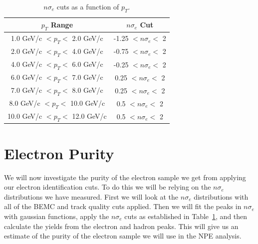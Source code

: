 \begin{table}
\centering
\begin{tabular}{|c|c|}
\hline
$p_T$ Range            & $n\sigma_e$ Cut \\
\hline
1.0 GeV/c $< p_T <$ 2.0 GeV/c   & -1.25 $< n\sigma_e <$ 2\\
\hline
2.0 GeV/c $< p_T <$ 4.0 GeV/c   & -0.75 $< n\sigma_e <$ 2\\
\hline
4.0 GeV/c $< p_T <$ 6.0 GeV/c   & -0.25 $< n\sigma_e <$ 2\\
\hline
6.0 GeV/c $< p_T <$ 7.0 GeV/c   & 0.25 $< n\sigma_e <$ 2\\
\hline
7.0 GeV/c $< p_T <$ 8.0 GeV/c   & 0.25 $< n\sigma_e <$ 2\\
\hline
8.0 GeV/c $< p_T <$ 10.0 GeV/c   & 0.5 $< n\sigma_e <$ 2\\
\hline
10.0 GeV/c $< p_T <$ 12.0 GeV/c   & 0.5 $< n\sigma_e <$ 2\\
\hline
\end{tabular}
\caption[$n\sigma_e$ Cuts]{$n\sigma_e$ cuts as a function of $p_T$.}
\label{tab:nsigma}
\end{table}

\section{Electron Purity}

We will now investigate the purity of the electron sample we get from applying our electron identification cuts. To do this we will be relying on the $n\sigma_e$ distributions we have measured. First we will look at the $n\sigma_e$ distributions with all of the BEMC and track quality cuts applied. Then we will fit the peaks in $n\sigma_e$ with gaussian functions, apply the $n\sigma_e$ cuts as established in Table~\ref{tab:nsigma}, and then calculate the yields from the electron and hadron peaks. This will give us an estimate of the purity of the electron sample we will use in the NPE analysis.

